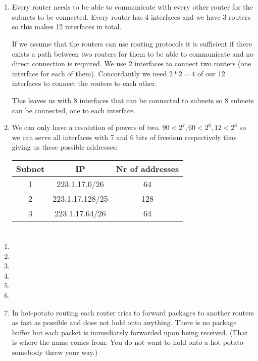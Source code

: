 \documentclass[12pt, a4paper]{article}
\begin{document}
\section{} %
\begin{enumerate}[a]
	\item %
	Every router needs to be able to communicate with every other router for the subnets to be connected. Every router has 4 interfaces and we have 3 routers so this makes 12 interfaces in total.

	If we assume that the routers can use routing protocols it is sufficient if there exists a path between two routers for them to be able to communicate and no direct connection is required. We use 2 interfaces to connect two routers (one interface for each of them). Concordantly we need $2 * 2 = 4$ of our 12 interfaces to connect the routers to each other.

	This leaves us with 8 interfaces that can be connected to subnets so 8 subnets can be connected, one to each interface.

	\item %
	We can only have a resolution of powers of two. $90 < 2^7, 60 < 2^6, 12 < 2^6$ so we can serve all interfaces with 7 and 6 bits of freedom respectively thus giving us these possible addresses:

	\begin{tabular}{|c|c|c|}
		\hline
		Subnet & IP & Nr of addresses\\\hline
		1 & 223.1.17.0/26 & 64\\
		2 & 223.1.17.128/25 & 128\\
		3 & 223.1.17.64/26 & 64\\
		\hline
	\end{tabular}

\end{enumerate}

\section{} %
\begin{enumerate}[1]
	\item %
	\item %
	\item %
	\item %
	\item %
	\item %
	\item %
	In hot-potato routing each router tries to forward packages to another routers as fast as possible and does not hold onto anything. There is no package buffer but each packet is immediately forwarded upon being received. (That is where the name comes from: You do not want to hold onto a hot potato somebody threw your way.)
\end{enumerate}
\end{document}
